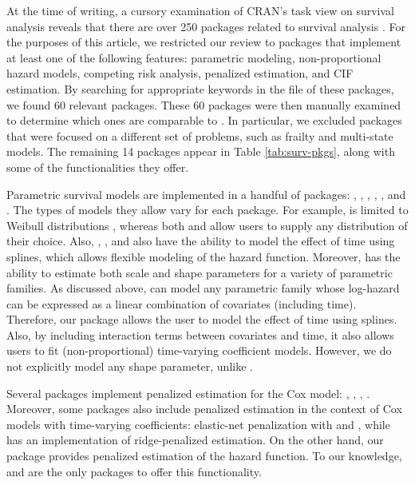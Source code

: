 \documentclass[
]{jss}
\begin{document}
At the time of writing, a cursory examination of CRAN's task view on
survival analysis reveals that there are over 250 packages related to
survival analysis \citeyearpar{survTaskView}. For the purposes of this
article, we restricted our review to packages that implement at least
one of the following features: parametric modeling, non-proportional
hazard models, competing risk analysis, penalized estimation, and CIF
estimation. By searching for appropriate keywords in the
 file of these packages, we found 60 relevant
packages. These 60 packages were then manually examined to determine
which ones are comparable to . In particular, we excluded
packages that were focused on a different set of problems, such as
frailty and multi-state models. The remaining 14 packages appear in
Table \ref{tab:surv-pkgs}, along with some of the functionalities they
offer.

Parametric survival models are implemented in a handful of packages:
 \citeyearpar{mahani2015bayesian}, 
\citeyearpar{flexsurv},  \citeyearpar{smoothHazard},
 \citeyearpar{clements_liu}, 
\citeyearpar{scheike2014estimating}, and 
\citeyearpar{survival-package}. The types of models they allow vary for
each package. For example,  is limited to Weibull
distributions \citeyearpar{smoothHazard}, whereas both 
and  allow users to supply any distribution of their
choice. Also, , ,  and
 also have the ability to model the effect of time using
splines, which allows flexible modeling of the hazard function.
Moreover,  has the ability to estimate both scale and
shape parameters for a variety of parametric families. As discussed
above,  can model any parametric family whose log-hazard
can be expressed as a linear combination of covariates (including time).
Therefore, our package allows the user to model the effect of time using
splines. Also, by including interaction terms between covariates and
time, it also allows users to fit (non-proportional) time-varying
coefficient models. However, we do not explicitly model any shape
parameter, unlike .

Several packages implement penalized estimation for the Cox model:
 \citeyearpar{regpathcox}, 
\citeyearpar{park_hastie},  \citeyearpar{l1penal},
 \citeyearpar{gerds_blanche}. Moreover, some
packages also include penalized estimation in the context of Cox models
with time-varying coefficients: elastic-net penalization with
 \citeyearpar{perperoglou} and 
\citeyearpar{clements_liu}, while 
\citeyearpar{survival-package} has an implementation of ridge-penalized
estimation. On the other hand, our package  provides
penalized estimation of the hazard function. To our knowledge,
 and  are the only packages to offer this
functionality.
\end{document}
